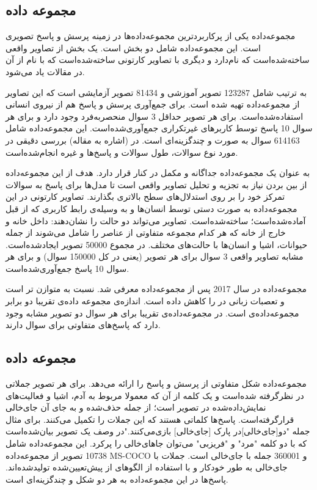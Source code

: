 \subsection{مجموعه داده }
{
مجموعه‌داده
یکی از پرکاربردترین مجموعه‌داده‌ها در زمینه پرسش و پاسخ تصویری است. این مجموعه‌داده شامل دو بخش است. یک بخش از تصاویر واقعی ساخته‌شده‌است که
 نام‌دارد و دیگری با تصاویر کارتونی ساخته‌شده‌است که با نام 
 از آن در مقالات یاد می‌شود.
 
 
 به ترتیب شامل 123287 تصویر آموزشی و 81434 تصویر آزمایشی است که این تصاویر از مجموعه‌داده
  تهیه شده است.  برای جمع‌آوری پرسش و پاسخ هم از نیروی انسانی استفاده‌شده‌است. برای هر تصویر حداقل 3 سوال منحصربه‌فرد وجود دارد و برای هر سوال 10 پاسخ توسط کاربرهای غیرتکراری جمع‌آوری‌شده‌است. این مجموعه‌داده شامل 614163 سوال به صورت 
  و چندگزینه‌ای است. در (اشاره به مقاله) بررسی دقیقی در مورد نوع سوالات، طول سوالات و پاسخ‌ها و غیره انجام‌شده‌است.
  
  
 به عنوان یک مجموعه‌داده جداگانه و مکمل در کنار
 قرار دارد. هدف از این مجموعه‌داده از بین بردن نیاز به تجزیه و تحلیل تصاویر واقعی است تا مدل‌ها برای پاسخ به سوالات تمرکز خود را بر روی استدلال‌های سطح بالاتری بگذارند. تصاویر کارتونی در این مجموعه‌داده به صورت دستی توسط انسان‌ها و به وسیله‌ی رابط کاربری که از قبل آماده‌شده‌است؛ ساخته‌شده‌است. تصاویر می‌تواند دو حالت را نشان‌دهند: داخل خانه و خارج از خانه که هر کدام مجموعه متفاوتی از عناصر را شامل می‌شوند از جمله حیوانات، اشیا و انسان‌ها با حالت‌های مختلف. در مجموع 50000 تصویر ایجاد‌شده‌است. مشابه تصاویر واقعی 3 سوال برای هر تصویر (یعنی در کل 150000 سوال) و برای هر سوال 10 پاسخ  جمع‌آوری‌شده‌است.
 
 مجموعه‌داده 
در سال 2017 پس از مجموعه‌داده 
معرفی شد. 
نسبت به 
متوازن تر است و تعصبات زبانی در 
را کاهش داده است. اندازه‌ی مجموعه داده‌ی
تقریبا دو برابر مجموعه‌داده‌ی 
است. در مجموعه‌داده‌ی
تقریبا برای هر سوال دو تصویر مشابه وجود دارد که پاسخ‌های متفاوتی برای سوال دارند.
}

\subsection{مجموعه داده }
{
	مجموعه‌داده 
	شکل متفاوتی از پرسش و پاسخ را ارائه می‌دهد. برای هر تصویر جملاتی در نظرگرفته شده‌است و یک کلمه از آن که معمولا مربوط به آدم، اشیا و  فعالیت‌های نمایش‌داده‌شده در تصویر است؛ از جمله حذف‌شده و به جای آن جای‌خالی قرار‌گرفته‌است. پاسخ‌ها کلماتی هستند که این جملات را تکمیل می‌کنند. برای مثال جمله "دو[جای‌خالی]در پارک [جای‌خالی] بازی‌می‌کنند."در وصف یک تصویر بیان‌شده‌است که با دو کلمه "مرد" و "فریزبی" می‌توان جاهای‌خالی‌ را پرکرد. این مجموعه‌داده شامل 10738 تصویر از مجموعه‌داده MS-COCO و 360001 جمله با جای‌خالی است. جملات با جای‌خالی به طور خودکار و با استفاده از الگوهای از پیش‌تعیین‌شده تولیدشده‌اند. پاسخ‌ها در این مجموعه‌داده به هر دو شکل 
	و چند‌گزینه‌ای است.
}

